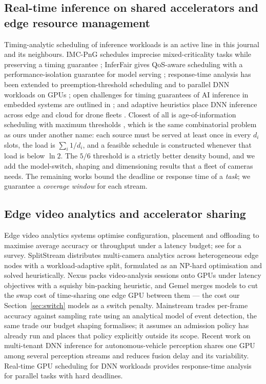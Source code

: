 \documentclass[final,5p,times,twocolumn]{elsarticle}
\theoremstyle{definition}
\begin{document}
\subsection{Real-time inference on shared accelerators and edge resource management}
Timing-analytic scheduling of inference workloads is an active line in this journal and its
neighbours. IMC-PnG schedules imprecise mixed-criticality tasks while preserving a timing
guarantee \cite{lee2024imcpng}; InferFair gives QoS-aware scheduling with a performance-isolation
guarantee for model serving \cite{peng2024inferfair}; response-time analysis has been extended to
preemption-threshold scheduling \cite{zhang2026prta} and to parallel DNN workloads on
GPUs \cite{zou2023rtgpu}; open challenges for timing guarantees of AI inference in embedded
systems are outlined in \cite{lee2025timing}; and adaptive heuristics place DNN inference across
edge and cloud for drone fleets \cite{raj2025uavfleets}. Closest of all is age-of-information
scheduling with maximum thresholds \cite{li2020aoi,li2022aoi}, which is the same combinatorial
problem as ours under another name: each source must be served at least once in every $d_i$
slots, the load is $\sum_i 1/d_i$, and a feasible schedule is constructed whenever that load is
below $\ln 2$. The $5/6$ threshold is a strictly better density bound, and we add the
model-switch, shaping and dimensioning results that a fleet of cameras needs. The remaining works
bound the deadline or response time of a \emph{task}; we guarantee a \emph{coverage window} for
each stream.

\subsection{Edge video analytics and accelerator sharing}
Edge video analytics systems optimise configuration, placement and offloading to maximise average
accuracy or throughput under a latency budget; see \cite{zhou2023comst} for a survey. SplitStream
\cite{liang2024splitstream} distributes multi-camera analytics across heterogeneous edge nodes with
a workload-adaptive split, formulated as an NP-hard optimisation and solved heuristically.
Nexus \cite{shen2019nexus} packs video-analysis sessions onto GPUs under latency objectives with
a squishy bin-packing heuristic, and Gemel \cite{padmanabhan2023gemel} merges models to cut the
swap cost of time-sharing one edge GPU between them --- the cost our Section~\ref{sec:switch}
models as a switch penalty. Mainstream \cite{jiang2018mainstream} trades per-frame accuracy
against sampling rate using an analytical model of event detection, the same trade our budget
shaping formalises; it assumes an admission policy has already run and places that policy
explicitly outside its scope. Recent work on multi-tenant DNN inference for
autonomous-vehicle perception \cite{liu2026multitenant} shares one GPU among several perception
streams and reduces fusion delay and its variability. Real-time GPU scheduling for DNN workloads
\cite{zou2023rtgpu} provides response-time analysis for parallel tasks with hard deadlines.
\end{document}
